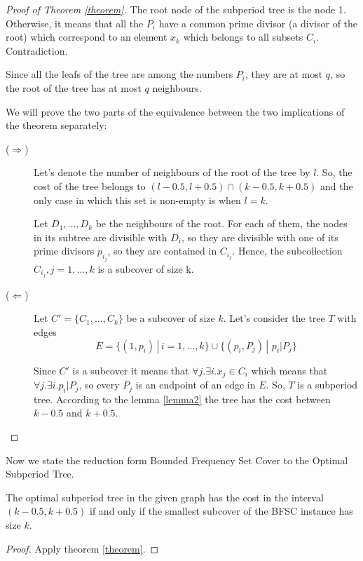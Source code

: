\begin{proof}[Proof of Theorem \ref{theorem}]
The root node of the subperiod tree is the node 1. Otherwise, it means that all the $P_i$ have a common prime divisor (a divisor of the root) which correspond to an element $x_k$ which belongs to all subsets $C_i$. Contradiction.

Since all the leafs of the tree are among the numbers $P_i$, they are at most $q$, so the root of the tree has at most $q$ neighbours.

We will prove the two parts of the equivalence between the two implications of the theorem separately:

\begin{description}
\item[($\Rightarrow$)] 
Let's denote the number of neighbours of the root of the tree by $l$. So, the cost of the tree belongs to $(l-0.5, l+0.5)\cap (k-0.5,k+0.5)$ and the only case in which this set is non-empty is when $l=k$.

Let $D_1, \ldots, D_k$ be the neighbours of the root. For each of them, the nodes in its subtree are divisible with $D_i$, so they are divisible with one of its prime divisors $p_{i_j}$, so they are contained in $C_{i_j}$. Hence, the subcollection $C_{i_j},j=1,\ldots,k$ is a subcover of size k.

\item[($\Leftarrow$)] Let $C'=\{C_1,\ldots,C_k\}$ be a subcover of size $k$. Let's consider the tree $T$ with edges 
$$E = \{(1, p_i) \,|\, i=1,\ldots, k\} \cup \{(p_i, P_j) \,| \,\, p_i | P_j\}$$

Since $C'$ is a subcover it means that $\forall j. \exists i. x_j \in C_i$ which means that $\forall j. \exists i. p_i \vert P_j$, so every $P_j$ is an endpoint of an edge in $E$. So, $T$ is a subperiod tree. According to the lemma \ref{lemma2} the tree has the cost between $k-0.5$ and $k+0.5$.

\end{description}\end{proof}

Now we state the reduction form Bounded Frequency Set Cover to the Optimal Subperiod Tree.
\begin{theorem}
The optimal subperiod tree in the given graph has the cost in the interval $(k-0.5, k+0.5)$ if and only if the smallest subcover of the BFSC instance has size $k$.
\end{theorem}

\begin{proof}
Apply theorem \ref{theorem}.
\end{proof}

